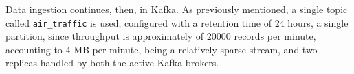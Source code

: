 Data ingestion continues, then, in Kafka. As previously mentioned, a single topic called \texttt{air\_traffic} is used, configured with a retention time of 24 hours, a single partition, since throughput is approximately of $20000$ records per minute, accounting to 4 MB per minute, being a relatively sparse stream, and two replicas handled by both the active Kafka brokers.
\pagebreak